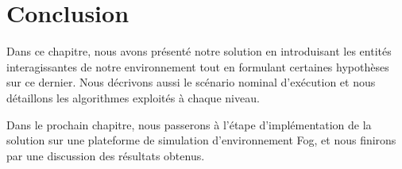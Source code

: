\section{Conclusion}
Dans ce chapitre, nous avons présenté notre solution en introduisant les entités interagissantes de notre environnement tout en formulant certaines hypothèses sur ce dernier. Nous décrivons aussi le scénario nominal d'exécution et nous détaillons les algorithmes exploités à chaque niveau.\par
Dans le prochain chapitre, nous passerons à l'étape d'implémentation de la solution sur une plateforme de simulation d'environnement Fog, et nous finirons par une discussion des résultats obtenus.
